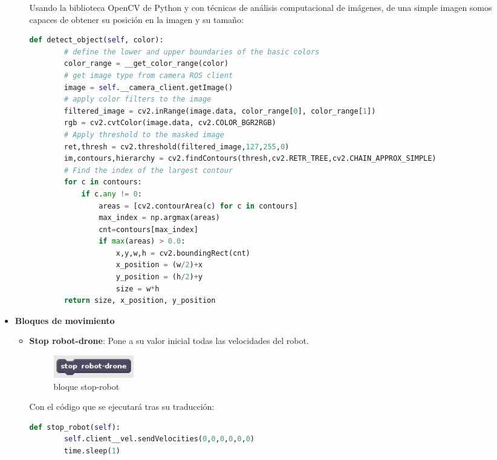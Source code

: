 \begin{itemize}
\begin{itemize}
 Usando la biblioteca OpenCV de Python y con técnicas de análisis computacional de imágenes, de una simple imagen somos capaces de obtener su posición en la imagen y su tamaño:\\
 
 \begin{lstlisting}[language=python,firstnumber=1]
    def detect_object(self, color):
        # define the lower and upper boundaries of the basic colors
        color_range = __get_color_range(color)
        # get image type from camera ROS client
        image = self.__camera_client.getImage()
        # apply color filters to the image
        filtered_image = cv2.inRange(image.data, color_range[0], color_range[1])
        rgb = cv2.cvtColor(image.data, cv2.COLOR_BGR2RGB)
        # Apply threshold to the masked image
        ret,thresh = cv2.threshold(filtered_image,127,255,0)
        im,contours,hierarchy = cv2.findContours(thresh,cv2.RETR_TREE,cv2.CHAIN_APPROX_SIMPLE)
        # Find the index of the largest contour
        for c in contours:
            if c.any != 0:
                areas = [cv2.contourArea(c) for c in contours]
                max_index = np.argmax(areas)
                cnt=contours[max_index]
                if max(areas) > 0.0:
                    x,y,w,h = cv2.boundingRect(cnt)
                    x_position = (w/2)+x
                    y_position = (h/2)+y
                    size = w*h
        return size, x_position, y_position
\end{lstlisting}


	\end{itemize}
\item \textbf{Bloques de movimiento}
	\begin{itemize}
	\item \textbf{Stop robot-drone}: Pone a su valor inicial todas las velocidades del robot.\\
	\begin{figure}[H]
     		\centering
     		\includegraphics[scale=1.2]{img/block-stop.png}
     		\caption{bloque stop-robot}
  		\label{fig:listas}
  				\end{figure}
Con el código que se ejecutará tras su traducción:\\

 \begin{lstlisting}[language=python,firstnumber=1]
    def stop_robot(self):
        self.client__vel.sendVelocities(0,0,0,0,0,0)
        time.sleep(1)


\end{lstlisting}
\end{itemize}
\end{itemize}
